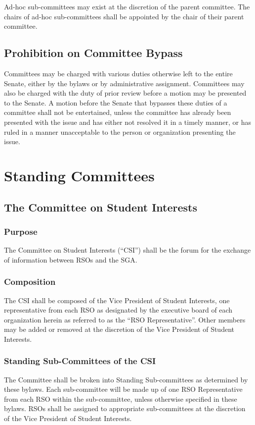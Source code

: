 \documentclass[12pt]{scrreprt}
\begin{document}
Ad-hoc sub-committees may exist at the discretion of the parent committee. The 
chairs of ad-hoc sub-committees shall be appointed by the chair of their 
parent committee.

\section{Prohibition on Committee Bypass}
Committees may be charged with various duties otherwise left to the entire 
Senate, either by the bylaws or by administrative assignment. Committees may 
also be charged with the duty of prior review before a motion may be presented 
to the Senate. A motion before the Senate that bypasses these duties of a 
committee shall not be entertained, unless the committee has already been 
presented with the issue and has either not resolved it in a timely manner, or 
has ruled in a manner unacceptable to the person or organization presenting 
the issue.

\chapter{Standing Committees}

\section{The Committee on Student Interests} \label{sec:csi_representative}

\subsection{Purpose}
The Committee on Student Interests (``CSI'') shall be the forum for the 
exchange of information between RSOs and the SGA.

\subsection{Composition}
The CSI shall be composed of the Vice President of Student Interests, one representative from each RSO as designated by the executive board of each organization herein as referred to as the ``RSO Representative''. Other members may be added or removed at the discretion of the Vice President of Student Interests.

\subsection{Standing Sub-Committees of the CSI} \label{sec:csi_subcommittees}
The Committee shall be broken into Standing Sub-committees as determined by 
these bylaws. Each sub-committee will be made up of one RSO Representative from each RSO within the sub-committee, unless otherwise 
specified in these bylaws. RSOs shall be assigned to appropriate sub-committees at the discretion of the Vice President of Student Interests.
\end{document}

